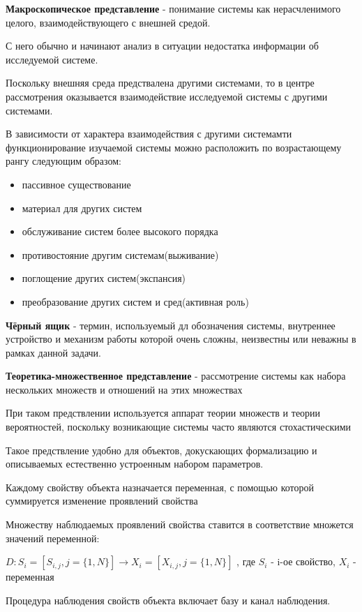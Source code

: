 \documentclass[a4paper]{article}
\begin{document}
	\textbf{Макроскопическое представление} - понимание системы как нерасчленимого целого, взаимодействующего с внешней средой.
	
	С него обычно и начинают анализ в ситуации недостатка информации об исследуемой системе.
	
	Поскольку внешняя среда предствалена другими системами, то в центре рассмотрения оказывается взаимодействие исследуемой системы с другими системами.
	
	В зависимости от характера взаимодействия с другими системамти функционирование изучаемой системы можно расположить по возрастающему рангу следующим образом:
		\begin{itemize}
		\item пассивное существование
		\item материал для других систем
		\item обслуживание систем более высокого порядка
		\item противостояние другим системам(выживание)
		\item поглощение других систем(экспансия)
		\item преобразование других систем и сред(активная роль)
	\end{itemize}

	\textbf{Чёрный ящик} - термин, используемый дл обозначения системы, внутреннее устройство и механизм работы которой очень сложны, неизвестны или неважны в рамках данной задачи.
	
	\textbf{Теоретика-множественное представление} - рассмотрение системы как набора нескольких множеств и отношений на этих множествах
	
	При таком предствлении используется аппарат теории множеств и теории вероятностей, поскольку возникающие системы часто являются стохастическими
	
	Такое предствление удобно для объектов, докускающих формализацию и описываемых естественно устроенным набором параметров.	
	
	Каждому свойству объекта назначается переменная, с помощью которой суммируется изменение проявлений свойства
	
	Множеству наблюдаемых проявлений свойства ставится в соответствие множется значений переменной:
	
	$ D: S_i = [S_{i,j}, j = \{1, N\}] \rightarrow X_i = [X_{i,j}, j = \{1, N\}]$ , где $ S_i $ - i-ое свойство, $ X_i $ - переменная
	
	Процедура наблюдения свойств объекта включает базу и канал наблюдения.
	
\end{document}
